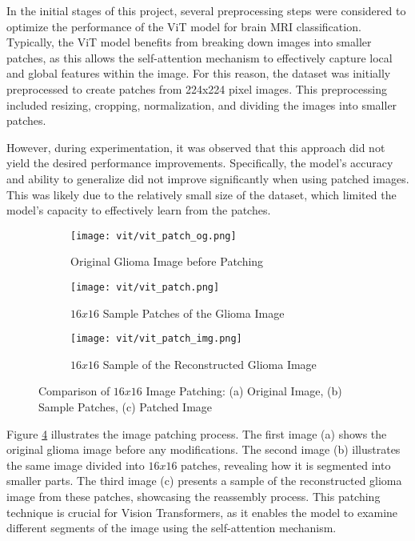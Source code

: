 In the initial stages of this project, several preprocessing steps were considered to optimize the performance of the ViT model for brain MRI classification. Typically, the ViT model benefits from breaking down images into smaller patches, as this allows the self-attention mechanism to effectively capture local and global features within the image. For this reason, the dataset was initially preprocessed to create patches from 224x224 pixel images. This preprocessing included resizing, cropping, normalization, and dividing the images into smaller patches.

However, during experimentation, it was observed that this approach did not yield the desired performance improvements. Specifically, the model's accuracy and ability to generalize did not improve significantly when using patched images. This was likely due to the relatively small size of the dataset, which limited the model's capacity to effectively learn from the patches. 

\begin{figure}[H]
  \centering
  \begin{subfigure}[b]{0.30\textwidth}
      \centering
      \texttt{[image: vit/vit\_patch\_og.png]}
      \caption{Original Glioma Image before Patching}
      \label{fig:vit_patch_og}
  \end{subfigure}
  \hfill
  \begin{subfigure}[b]{0.30\textwidth}
      \centering
      \texttt{[image: vit/vit\_patch.png]}
      \caption{$16x16$ Sample Patches of the Glioma Image}
      \label{fig:vit_patch}
  \end{subfigure}
  \hfill
  \begin{subfigure}[b]{0.30\textwidth}
      \centering
      \texttt{[image: vit/vit\_patch\_img.png]}
      \caption{$16x16$ Sample of the Reconstructed Glioma Image}
      \label{fig:vit_patch2}
  \end{subfigure}
  \caption{Comparison of $16x16$ Image Patching: (a) Original Image, (b) Sample Patches, (c) Patched Image}
  \label{fig:vit_patches}
\end{figure}

Figure \ref{fig:vit_patches} illustrates the image patching process. The first image (a) shows the original glioma image before any modifications. The second image (b) illustrates the same image divided into $16x16$ patches, revealing how it is segmented into smaller parts. The third image (c) presents a sample of the reconstructed glioma image from these patches, showcasing the reassembly process. This patching technique is crucial for Vision Transformers, as it enables the model to examine different segments of the image using the self-attention mechanism.

